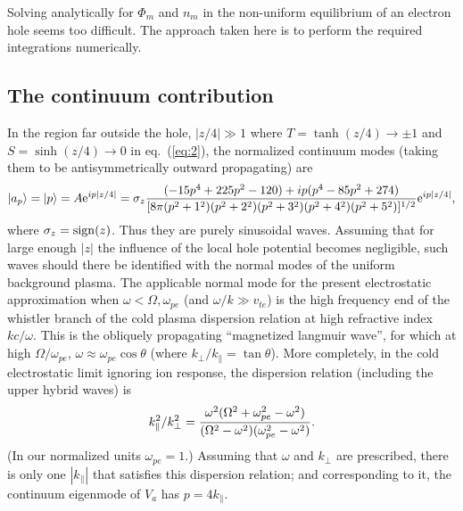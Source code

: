 \documentclass[12pt]{article}
\def\ket#1{|#1\rangle}
\def\etothe#1{{\rm e}^{#1}}
\begin{document}
Solving analytically for $\Phi_m$ and $n_m$ in the non-uniform
equilibrium of an electron hole seems too difficult. The approach
taken here is to perform the required integrations numerically.



\subsection{The continuum contribution}

In the region far outside the hole, $|z/4|\gg 1$ where
$T=\tanh(z/4)\to\pm1$ and $S=\sinh(z/4)\to0$ in eq.\ (\ref{eq:2}), the
normalized continuum modes (taking them to be antisymmetrically
outward propagating) are
\begin{equation}
  \label{eq:14}
 \ket{a_p}= \ket{p}=A\etothe{ip|z/4|}=\sigma_z{(-15p^4+225p^2-120) +ip (p^{4}-85p^{2}+274)\over
      [8\pi(p^2+1^2)(p^2+2^2)(p^2+3^2)(p^2+4^2)(p^2+5^2)]^{1/2}}\etothe{ip|z/4|},
\end{equation}
where $\sigma_z={\rm sign}(z)$. Thus they are purely sinusoidal
waves. Assuming that for large enough $|z|$ the influence of the local
hole potential becomes negligible, such waves should there be
identified with the normal modes of the uniform background plasma.
The applicable normal mode for the present electrostatic approximation
when $\omega<\Omega,\omega_{pe}$ (and $\omega/k\gg v_{te}$) is the high
frequency end of the whistler branch of the cold plasma dispersion
relation at high refractive index $kc/\omega$. This is the obliquely
propagating ``magnetized langmuir wave'', for which at high
$\Omega/\omega_{pe}$, 
$\omega\approx\omega_{pe}\cos\theta$ (where
$k_\perp/k_\parallel=\tan\theta$). More completely, in the cold
electrostatic limit ignoring ion response, the dispersion relation
(including the upper hybrid waves) is
\begin{equation}
  \label{eq:15}
  k_\parallel^2/k_\perp^2={\omega^2(\Omega^2+\omega_{pe}^2-\omega^2)
    \over(\Omega^2-\omega^2)(\omega_{pe}^2-\omega^2)}.
\end{equation}
(In our normalized units $\omega_{pe}=1$.)  Assuming that $\omega$ and
$k_\perp$ are prescribed, there is only one $|k_\parallel|$ that
satisfies this dispersion relation; and corresponding to it, the
continuum eigenmode of $V_a$ has $p=4k_\parallel$.
\end{document}
